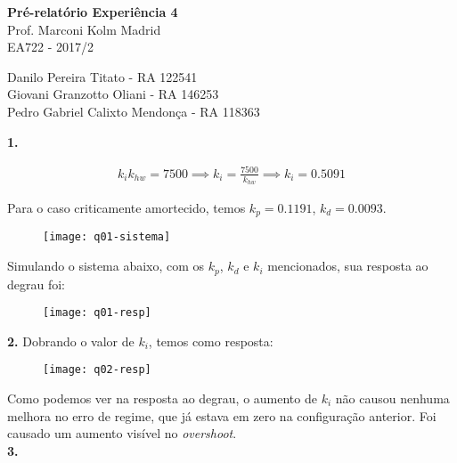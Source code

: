 \documentclass[a4paper,11pt]{article}
\begin{document}
	

\begin{center}
\textbf{Pré-relatório Experiência 4} \\
\hspace{5pt}
Prof. Marconi Kolm Madrid \\
EA722 - 2017/2
\end{center}

\begin{center}
Danilo Pereira Titato - RA 122541 \\
Giovani Granzotto Oliani - RA 146253 \\
Pedro Gabriel Calixto Mendonça - RA 118363 \\
\end{center}

\textbf{1.}

\begin{gather*}
    k_i k_{hw} = 7500 \implies k_i = \frac{7500}{k_{hw}} \implies
        k_i = 0.5091
\end{gather*}

Para o caso criticamente amortecido, temos $k_p = 0.1191$, $k_d = 0.0093$.

\begin{figure}[H]
\texttt{[image: q01-sistema]}
\centering
\end{figure}

Simulando o sistema abaixo, com os $k_p$, $k_d$ e $k_i$ mencionados, sua
resposta ao degrau foi:

\begin{figure}[H]
\texttt{[image: q01-resp]}
\centering
\end{figure}

\pagebreak

\textbf{2.} Dobrando o valor de $k_i$, temos como resposta:

\begin{figure}[H]
\texttt{[image: q02-resp]}
\centering
\end{figure}

Como podemos ver na resposta ao degrau, o aumento de $k_i$ não causou nenhuma
melhora no erro de regime, que já estava em zero na configuração anterior. Foi
causado um aumento visível no \textit{overshoot}. \\

\textbf{3.}
\end{document}
